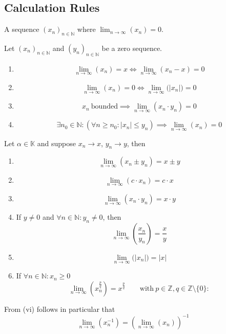 \subsection{Calculation Rules}
\begin{definition}
   A sequence \((x_n)_{n \in \mathbb{N}}\) where \(\lim_{n \to \infty}(x_n) = 0\).
\end{definition}

\begin{lemma}\label{lem:zero_seq}
   Let \((x_n)_{n \in \mathbb{N}}\) and \((y_n)_{n \in \mathbb{N}}\) be a zero sequence.
   \begin{enumerate}[label=\roman*, align=Center]
      \item \[\lim_{n \to \infty}(x_n) = x \iff \lim_{n \to \infty} (x_n - x) = 0\]
      \item \[\lim_{n \to \infty}(x_n) = 0 \iff \lim_{n \to \infty}\big(\lvert x_n\rvert\big) = 0\]
      \item \[x_n~\text{bounded} \implies \lim_{n \to \infty} (x_n \cdot y_n) = 0\]
      \item \[\exists n_0 \in \mathbb{N}: (\forall n \geq n_0: |x_n| \leq y_n) \implies \lim_{n \to \infty}(x_n) = 0\]
   \end{enumerate}
\end{lemma}

\begin{proposition}\label{pro:seq_limit_rules}
   Let \(\alpha \in \mathbb{K}\) and suppose \(x_n \to x\), \(y_n \to y\), then
   \begin{enumerate}[label=\roman*, align=Center]
      \item \[\lim_{n \to \infty}(x_n \pm y_n) = x \pm y\]
      \item \[\lim_{n \to \infty}(c \cdot x_n) = c \cdot x\]
      \item \[\lim_{n \to \infty}(x_n \cdot y_n) = x \cdot y\]
      \item If \(y \neq 0\) and \(\forall n \in \mathbb{N}: y_n \neq 0\), then
         \[\lim_{n \to \infty} \left(\frac{x_n}{y_n}\right) = \frac{x}{y}\]
      \item \[\lim_{n \to \infty}\big(\lvert x_n\rvert\big) = \lvert x \rvert\]
      \item If \(\forall n \in \mathbb{N}: x_n \geq 0\)
         \[\lim_{n \to \infty} \left(x_n^{\frac{p}{q}}\right) = x^{\frac{p}{q}} \qquad\text{with}~p \in \mathbb{Z}, q \in \mathbb{Z} \setminus \{0\}: \]
   \end{enumerate}
\end{proposition}
\begin{remark}
   From (vi) follows in particular that
   \[\lim_{n \to \infty}(x_n^{-1}) = \left(\lim_{n \to \infty}(x_n)\right)^{-1}\]
\end{remark}

